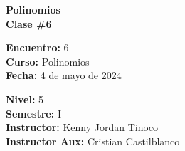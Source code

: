 \begin{center} \textbf
{
    \Large Polinomios \\ \vspace{2mm}Clase \#6
}
\end{center}

\begin{multicols}{2}
{
    \textbf{Encuentro:} 6\\
    \textbf{Curso:} Polinomios\\
    \textbf{Fecha:} 4 de mayo de 2024\\
    \begin{flushright}
        \textbf{Nivel:} 5\\
        \textbf{Semestre:} I\\
        \textbf{Instructor:} Kenny Jordan Tinoco\\
        \textbf{Instructor Aux:} Cristian Castilblanco
    \end{flushright}
}
\end{multicols}

\thispagestyle{first-page-style}